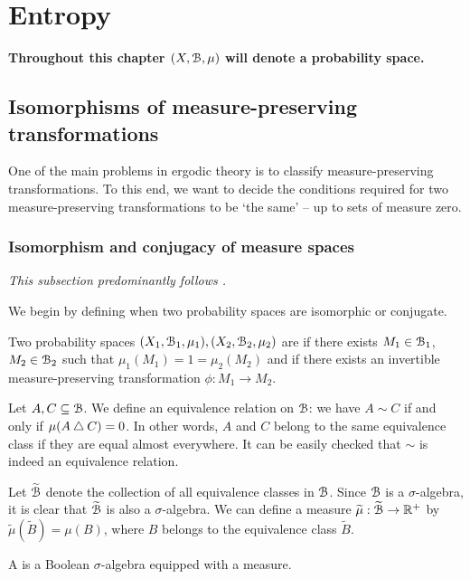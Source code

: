 \chapter{Entropy}
\begin{mdframed}[linewidth=2,leftmargin=108,rightmargin=108,skipbelow=30]
	\textbf{Throughout this chapter $(X, \mathcal{B}, \mu)$ will denote a probability space.}
\end{mdframed}

\section{Isomorphisms of measure-preserving transformations}
One of the main problems in ergodic theory is to classify measure-preserving transformations. To this end, we want to decide the conditions required for two measure-preserving transformations to be `the same' -- up to sets of measure zero.

\subsection{Isomorphism and conjugacy of measure spaces}
\emph{This subsection predominantly follows \cite[Chapter 2]{walters:intro-to-ergodic-theory}.}

We begin by defining when two probability spaces are isomorphic or conjugate.

\begin{definition}
	Two probability spaces $(X_1, \mathcal{B}_1, \mu_1), (X_2, \mathcal{B}_2, \mu_2)$ are  if there exists $M_1 \in \mathcal{B}_1$, $M_2 \in \mathcal{B}_2$ such that $\mu_1(M_1) = 1 = \mu_2(M_2)$ and if there exists an invertible measure-preserving transformation $\phi: M_1 \to M_2$.
\end{definition}

Let $A, C \subseteq \mathcal{B}$. We define an equivalence relation on $\mathcal{B}$: we have $A \sim C$ if and only if $\mu(A \bigtriangleup C) = 0$. In other words, $A$ and $C$ belong to the same equivalence class if they are equal almost everywhere. It can be easily checked that $\sim$ is indeed an equivalence relation.

Let $\widetilde{\mathcal{B}}$ denote the collection of all equivalence classes in $\mathcal{B}$. Since $\mathcal{B}$ is a $\sigma$-algebra, it is clear that $\widetilde{\mathcal{B}}$ is also a $\sigma$-algebra. We can define a measure $\widetilde{\mu} : \widetilde{\mathcal{B}} \to \mathbb{R}^+$ by $\tilde{\mu}(\tilde{B}) = \mu(B)$, where $B$ belongs to the equivalence class $\tilde{B}$.

\begin{definition}
	A  is a Boolean $\sigma$-algebra equipped with a measure.
\end{definition}

